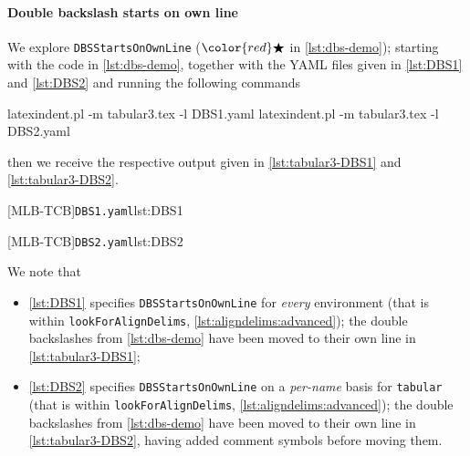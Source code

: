 \documentclass[10pt]{article}
\newcommand{\ElseStartsOnOwnLine}{\color{red}\bigstar}
\begin{document}
 \paragraph{Double backslash starts on own line}
  \begin{example}
  We explore \texttt{DBSStartsOnOwnLine} ($\ElseStartsOnOwnLine$ in \cref{lst:dbs-demo});
  starting with the code in \cref{lst:dbs-demo}, together with the YAML files given in
  \cref{lst:DBS1} and \cref{lst:DBS2} and running the following commands
   

  \begin{commandshell}
latexindent.pl -m tabular3.tex -l DBS1.yaml
latexindent.pl -m tabular3.tex -l DBS2.yaml
\end{commandshell}

  then we receive the respective output given in \cref{lst:tabular3-DBS1} and
  \cref{lst:tabular3-DBS2}.

  \begin{cmhtcbraster}
   [MLB-TCB]{\texttt{DBS1.yaml}}{lst:DBS1}
  \end{cmhtcbraster}

  \begin{cmhtcbraster}
   [MLB-TCB]{\texttt{DBS2.yaml}}{lst:DBS2}
  \end{cmhtcbraster}

  We note that
  \begin{itemize}
   \item \cref{lst:DBS1} specifies \texttt{DBSStartsOnOwnLine} for
         \emph{every} environment (that is within \texttt{lookForAlignDelims},
         \vref{lst:aligndelims:advanced});
         the double backslashes from \cref{lst:dbs-demo} have been moved to their own line in
         \cref{lst:tabular3-DBS1};
   \item \cref{lst:DBS2} specifies \texttt{DBSStartsOnOwnLine} on a
         \emph{per-name} basis for \texttt{tabular} (that is within \texttt{lookForAlignDelims},
         \vref{lst:aligndelims:advanced});
         the double backslashes from \cref{lst:dbs-demo} have been moved to their own line in
         \cref{lst:tabular3-DBS2}, having added comment symbols before moving them.
  \end{itemize}
  \end{example}
\end{document}
